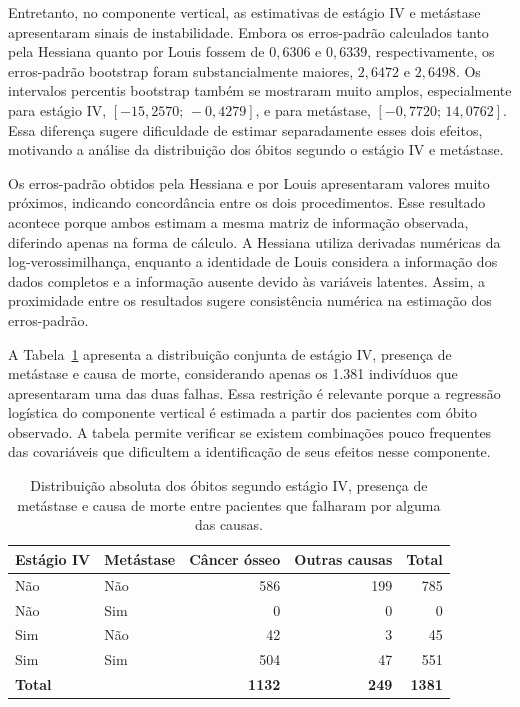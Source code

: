 \documentclass[11pt,a4paper]{article}
\begin{document}
Entretanto, no componente vertical, as estimativas de estágio IV e metástase apresentaram sinais de instabilidade. Embora os erros-padrão calculados tanto pela Hessiana quanto por Louis fossem de $0{,}6306$ e $0{,}6339$, respectivamente, os erros-padrão bootstrap foram substancialmente maiores, $2{,}6472$ e $2{,}6498$. Os intervalos percentis bootstrap também se mostraram muito amplos, especialmente para estágio IV, $[-15{,}2570;\,-0{,}4279]$, e para metástase, $[-0{,}7720;\,14{,}0762]$. Essa diferença sugere dificuldade de estimar separadamente esses dois efeitos, motivando a análise da distribuição dos óbitos segundo o estágio IV e metástase.

Os erros-padrão obtidos pela Hessiana e por Louis apresentaram valores muito próximos, indicando concordância entre os dois procedimentos. Esse resultado acontece porque ambos estimam a mesma matriz de informação observada, diferindo apenas na forma de cálculo. A Hessiana utiliza derivadas numéricas da log-verossimilhança, enquanto a identidade de Louis considera a informação dos dados completos e a informação ausente devido às variáveis latentes. Assim, a proximidade entre os resultados sugere consistência numérica na estimação dos erros-padrão.

A Tabela~\ref{tab:freq_estadio_metastase} apresenta a distribuição conjunta de estágio IV, presença de metástase e causa de morte, considerando apenas os 1.381 indivíduos que apresentaram uma das duas falhas. Essa restrição é relevante porque a regressão logística do componente vertical é estimada a partir dos pacientes com óbito observado. A tabela permite verificar se existem combinações pouco frequentes das covariáveis que dificultem a identificação de seus efeitos nesse componente.

\begin{table}[H]
\centering
\small
\setlength{\tabcolsep}{5pt}
\renewcommand{\arraystretch}{1.16}
\caption{Distribuição absoluta dos óbitos segundo estágio IV, presença de metástase e causa de morte entre pacientes que falharam por alguma das causas.}
\label{tab:freq_estadio_metastase}
\begin{tabular}{@{}llrrr@{}}
\toprule
Estágio IV & Metástase & Câncer ósseo & Outras causas & Total \\
\midrule
Não & Não & 586 & 199 & 785 \\
Não & Sim & 0 & 0 & 0 \\
Sim & Não & 42 & 3 & 45 \\
Sim & Sim & 504 & 47 & 551 \\
\midrule
\textbf{Total} &  & \textbf{1132} & \textbf{249} & \textbf{1381} \\
\bottomrule
\end{tabular}
\end{table}
\end{document}
